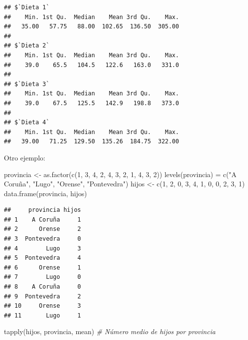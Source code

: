 \documentclass[
]{book}
\newenvironment{Shaded}{\begin{snugshade}}{\end{snugshade}}
\newcommand{\CommentTok}[1]{\textcolor[rgb]{0.56,0.35,0.01}{\textit{#1}}}
\newcommand{\DecValTok}[1]{\textcolor[rgb]{0.00,0.00,0.81}{#1}}
\newcommand{\FunctionTok}[1]{\textcolor[rgb]{0.00,0.00,0.00}{#1}}
\newcommand{\NormalTok}[1]{#1}
\newcommand{\OtherTok}[1]{\textcolor[rgb]{0.56,0.35,0.01}{#1}}
\newcommand{\StringTok}[1]{\textcolor[rgb]{0.31,0.60,0.02}{#1}}
\theoremstyle{break}
\theoremstyle{nonumberplain}
\begin{document}
\begin{verbatim}
## $`Dieta 1`
##    Min. 1st Qu.  Median    Mean 3rd Qu.    Max. 
##   35.00   57.75   88.00  102.65  136.50  305.00 
## 
## $`Dieta 2`
##    Min. 1st Qu.  Median    Mean 3rd Qu.    Max. 
##    39.0    65.5   104.5   122.6   163.0   331.0 
## 
## $`Dieta 3`
##    Min. 1st Qu.  Median    Mean 3rd Qu.    Max. 
##    39.0    67.5   125.5   142.9   198.8   373.0 
## 
## $`Dieta 4`
##    Min. 1st Qu.  Median    Mean 3rd Qu.    Max. 
##   39.00   71.25  129.50  135.26  184.75  322.00
\end{verbatim}

Otro ejemplo:

\begin{Shaded}
\begin{Highlighting}[]
\NormalTok{provincia }\OtherTok{\textless{}{-}} \FunctionTok{as.factor}\NormalTok{(}\FunctionTok{c}\NormalTok{(}\DecValTok{1}\NormalTok{, }\DecValTok{3}\NormalTok{, }\DecValTok{4}\NormalTok{, }\DecValTok{2}\NormalTok{, }\DecValTok{4}\NormalTok{, }\DecValTok{3}\NormalTok{, }\DecValTok{2}\NormalTok{, }\DecValTok{1}\NormalTok{, }\DecValTok{4}\NormalTok{, }\DecValTok{3}\NormalTok{, }\DecValTok{2}\NormalTok{))}
\FunctionTok{levels}\NormalTok{(provincia) }\OtherTok{=} \FunctionTok{c}\NormalTok{(}\StringTok{"A Coruña"}\NormalTok{, }\StringTok{"Lugo"}\NormalTok{, }\StringTok{"Orense"}\NormalTok{, }\StringTok{"Pontevedra"}\NormalTok{)}
\NormalTok{hijos }\OtherTok{\textless{}{-}} \FunctionTok{c}\NormalTok{(}\DecValTok{1}\NormalTok{, }\DecValTok{2}\NormalTok{, }\DecValTok{0}\NormalTok{, }\DecValTok{3}\NormalTok{, }\DecValTok{4}\NormalTok{, }\DecValTok{1}\NormalTok{, }\DecValTok{0}\NormalTok{, }\DecValTok{0}\NormalTok{, }\DecValTok{2}\NormalTok{, }\DecValTok{3}\NormalTok{, }\DecValTok{1}\NormalTok{)}
\FunctionTok{data.frame}\NormalTok{(provincia, hijos)}
\end{Highlighting}
\end{Shaded}

\begin{verbatim}
##     provincia hijos
## 1    A Coruña     1
## 2      Orense     2
## 3  Pontevedra     0
## 4        Lugo     3
## 5  Pontevedra     4
## 6      Orense     1
## 7        Lugo     0
## 8    A Coruña     0
## 9  Pontevedra     2
## 10     Orense     3
## 11       Lugo     1
\end{verbatim}

\begin{Shaded}
\begin{Highlighting}[]
\FunctionTok{tapply}\NormalTok{(hijos, provincia, mean) }\CommentTok{\# Número medio de hijos por provincia}
\end{Highlighting}
\end{Shaded}
\end{document}

